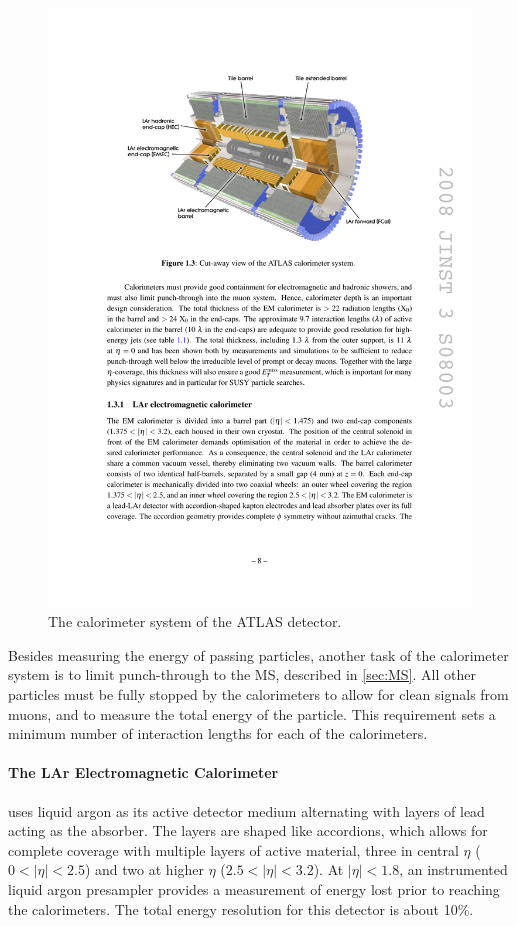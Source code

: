 \begin{centering}
\begin{figure}[bth]
\myfloatalign
\includegraphics[width=.90\linewidth]{figures/atlas/calorimeters.pdf}
\caption{The calorimeter system of the ATLAS detector.}
\label{fig:calo}
\end{figure}
\end{centering}

Besides measuring the energy of passing particles, another task of the calorimeter system is to limit punch-through to the \ac{MS}, described in \autoref{sec:MS}. All other particles must be fully stopped by the calorimeters to allow for clean signals from muons, and to measure the total energy of the particle. This requirement sets a minimum number of interaction lengths for each of the calorimeters. 

\paragraph{The LAr Electromagnetic Calorimeter} uses liquid argon as its active detector medium alternating with layers of lead acting as the absorber. The layers are shaped like accordions, which allows for complete coverage with multiple layers of active material, three in central $\eta$ ($0<|\eta|<2.5$) and two at higher $\eta$ ($2.5 < |\eta| < 3.2$). At $|\eta| < 1.8$, an instrumented liquid argon presampler provides a measurement of energy lost prior to reaching the calorimeters. The total energy resolution for this detector is about 10\%. 

